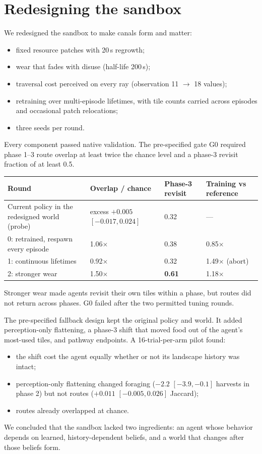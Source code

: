 \documentclass[11pt]{article}
\begin{document}
\section{Redesigning the sandbox}

We redesigned the sandbox to make canals form and matter:
\begin{itemize}
  \item fixed resource patches with 20\,s regrowth;
  \item wear that fades with disuse (half-life 200\,s);
  \item traversal cost perceived on every ray (observation 11 $\to$ 18 values);
  \item retraining over multi-episode lifetimes, with tile counts carried across episodes and occasional patch relocations;
  \item three seeds per round.
\end{itemize}
Every component passed native validation. The pre-specified gate G0 required phase 1--3 route overlap at least twice the chance level and a phase-3 revisit fraction of at least 0.5.

\begin{table}[H]
\centering\small
\begin{tabularx}{\linewidth}{@{}YYYY@{}}
\toprule
Round & Overlap / chance & Phase-3 revisit & Training vs reference\\
\midrule
Current policy in the redesigned world (probe) & excess $+0.005$ $[-0.017, 0.024]$ & 0.32 & ---\\
0: retrained, respawn every episode & 1.06$\times$ & 0.38 & 0.85$\times$\\
1: continuous lifetimes & 0.92$\times$ & 0.32 & 1.49$\times$ (abort)\\
2: stronger wear & 1.50$\times$ & \textbf{0.61} & 1.18$\times$\\
\bottomrule
\end{tabularx}
\end{table}

\noindent Stronger wear made agents revisit their own tiles within a phase, but routes did not return across phases. G0 failed after the two permitted tuning rounds.

The pre-specified fallback design kept the original policy and world. It added perception-only flattening, a phase-3 shift that moved food out of the agent's most-used tiles, and pathway endpoints. A 16-trial-per-arm pilot found:
\begin{itemize}
  \item the shift cost the agent equally whether or not its landscape history was intact;
  \item perception-only flattening changed foraging ($-2.2$ $[-3.9, -0.1]$ harvests in phase 2) but not routes ($+0.011$ $[-0.005, 0.026]$ Jaccard);
  \item routes already overlapped at chance.
\end{itemize}
We concluded that the sandbox lacked two ingredients: an agent whose behavior depends on learned, history-dependent beliefs, and a world that changes after those beliefs form.
\end{document}
